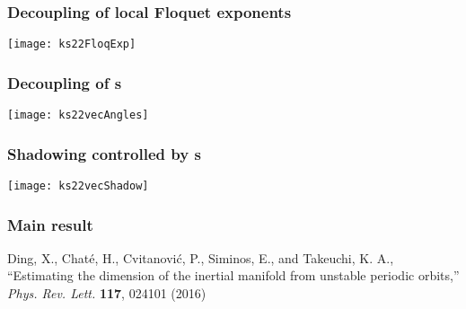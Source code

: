 \begin{frame}[shrink]%
  \frametitle{Decoupling of local Floquet exponents}

  {\centering
    \texttt{[image: ks22FloqExp]}
    \par}
  

\end{frame}

\begin{frame}[shrink]%
  \frametitle{Decoupling of \Fv s}

  {\centering
    \texttt{[image: ks22vecAngles]}
  \par}

\end{frame}

\begin{frame}[shrink]%
  \frametitle{Shadowing controlled by \Fv s}

  {\centering
    \texttt{[image: ks22vecShadow]}
    \par}

\end{frame}

\begin{frame}%
  \frametitle{Main result}


  \vfill
  

  \vfill 
  
  \begin{block}{}
    \textrm{
      \small
      Ding, X., Chat\'e, H., Cvitanovi\'c, P., Siminos, E., and Takeuchi, K. A.,
      ``Estimating the dimension of the inertial manifold from unstable
      periodic orbits,''
      {\color{red}\emph{ Phys. Rev. Lett.}} {\bf 117}, 024101 (2016)
    }
  \end{block}
\end{frame}
